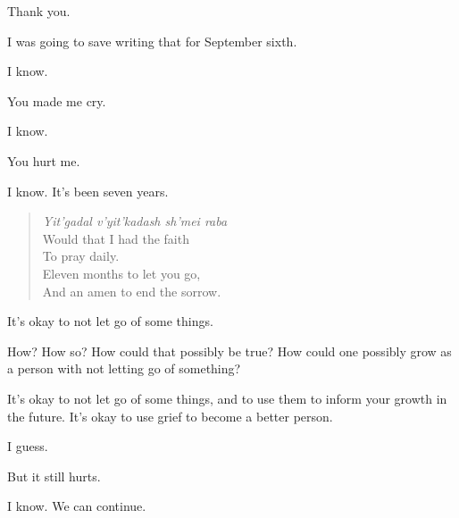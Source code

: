 \vfill

\begin{center}
\end{center}
\newpage

\begin{ally}
Thank you.
\end{ally}
I was going to save writing that for September sixth.

\begin{ally}
I know.
\end{ally}
You made me cry.

\begin{ally}
I know.
\end{ally}
You hurt me.

\begin{ally}
I know. It's been seven years.
\end{ally}

\begin{verse}
  \emph{Yit'gadal v'yit'kadash sh'mei raba}\\
  Would that I had the faith\\
  To pray daily.\\
  Eleven months to let you go,\\
  And an amen to end the sorrow.
\end{verse}

\begin{ally}
It's okay to not let go of some things.
\end{ally}
How? How so? How could that possibly be true? How could one possibly grow as a person with not letting go of something?

\begin{ally}
It's okay to not let go of some things, and to use them to inform your growth in the future. It's okay to use grief to become a better person.
\end{ally}
I guess.

But it still hurts.

\begin{ally}
I know. We can continue.
\end{ally}
\newpage
{}

